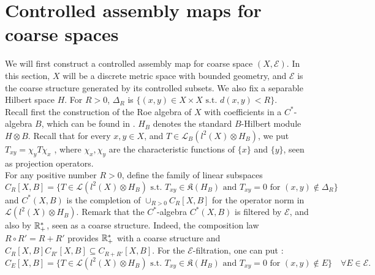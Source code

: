 \section{Controlled assembly maps for coarse spaces}

We will first construct a controlled assembly map for coarse space $(X,\mathcal E)$. In this section, $X$ will be a discrete metric space with bounded geometry, and $\mathcal E$ is the coarse structure generated by its controlled subsets. We also fix a separable Hilbert space $H$. For $R>0$, $\Delta_R$ is $\{(x,y)\in X\times X\text{ s.t. }d(x,y)<R\}$. \\

Recall first the construction of the Roe algebra of $X$ with coefficients in a $C^*$-algebra $B$, which can be found in \cite{SkTuYu}. $H_B$ denotes the standard $B$-Hilbert module $H\otimes B$. Recall that for every $x,y\in X$, and $T\in\mathcal L_B(l^2(X)\otimes H_B)$, we put $T_{xy}= \chi_y T\chi_x$ , where $\chi_x,\chi_y$ are the characteristic functions of $\{x\}$ and $\{y\}$, seen as projection operators.\\

For any positive number $R>0$, define the family of linear subspaces 
\[C_R[X,B]=\{T\in \mathcal L(l^2(X)\otimes H_B) \text{ s.t. } T_{xy}\in \mathfrak K(H_B) \text{ and }T_{xy}=0 \text{ for }(x,y)\not\in \Delta_R  \}\]
and $C^*(X,B)$ is the completion of $\cup_{R>0} C_R[X,B]$ for the operator norm in $\mathcal L(l^2(X)\otimes H_B) $. Remark that the $C^*$-algebra $C^*(X,B)$ is filtered by $\mathcal E$, and also by $\mathbb R_+^*$, seen as a coarse structure. Indeed, the composition law $R\circ R'= R+R'$ provides $\mathbb R_+^*$ with a coarse structure and $C_R[X,B] C_{R'} [X,B]\subseteq C_{R+R'}[X,B]$. For the $\mathcal E$-filtration, one can put :
\[C_E[X,B]=\{T\in \mathcal L(l^2(X)\otimes H_B) \text{ s.t. } T_{xy}\in \mathfrak K(H_B) \text{ and }T_{xy}=0 \text{ for }(x,y)\not\in E \}\quad \forall E\in\mathcal E.\]



